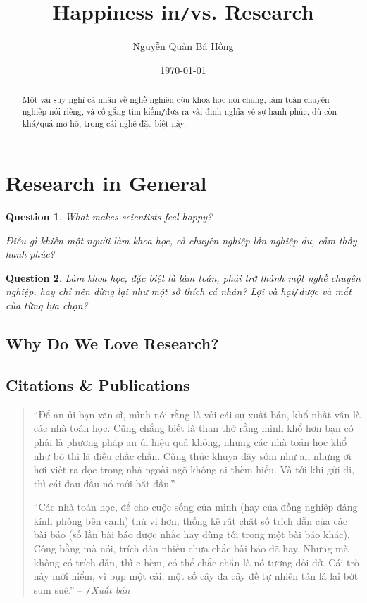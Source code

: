 \documentclass{article}
\title{Happiness in\texttt{/}vs. Research}
\author{Nguyễn Quản Bá Hồng}
\date{\today}
\numberwithin{equation}{section}
\newtheorem{question}{Question}[section]
\begin{document}
\maketitle
\begin{abstract}
	Một vài suy nghĩ cá nhân về nghề nghiên cứu khoa học nói chung, làm toán chuyên nghiệp nói riêng, và cố gắng tìm kiếm\texttt{/}đưa ra vài định nghĩa về sự hạnh phúc, dù còn khá\texttt{/}quá mơ hồ, trong cái nghề đặc biệt này.
\end{abstract}
\tableofcontents


\section{Research in General}
\begin{question}
	What makes scientists feel happy?
	
	Điều gì khiến một người làm khoa học, cả chuyên nghiệp lẫn nghiệp dư, cảm thấy hạnh phúc?
\end{question}

\begin{question}
	Làm khoa học, đặc biệt là làm toán, phải trở thành một nghề chuyên nghiệp, hay chỉ nên dừng lại như một sở thích cá nhân? Lợi và hại\texttt{/}được và mất của từng lựa chọn?
\end{question}

\subsection{Why Do We Love Research?}

\subsection{Citations \& Publications}
\begin{quotation}
	``Để an ủi bạn văn sĩ, mình nói rằng là với cái sự xuất bản, khổ nhất vẫn là các nhà toán học. Cũng chẳng  biết là than thở rằng mình khổ hơn bạn có phải là phương pháp an ủi hiệu quả không, nhưng  các nhà toán học khổ như bò thì là điều chắc chắn. Cũng thức khuya dậy sớm như ai, nhưng ơi hơi  viết ra đọc trong nhà ngoài ngõ không ai thèm hiểu. Và tới khi gửi đi, thì cái đau đầu nó mới bắt đầu.''
	
	``Các nhà toán học, để cho cuộc sống của mình (hay của đồng nghiêp đáng kính phòng bên cạnh) thú vị  hơn, thống kê rất chặt số trích dẫn của các bài báo (số lần bài báo được  nhắc hay dùng tới trong một bài báo khác). Công bằng mà nói, trích dẫn nhiều chưa chắc bài báo đã hay. Nhưng mà không có trích dẫn, thì e hèm, có thể chắc chắn là nó tương đối dở.  Cái trò này mới hiểm, vì bụp một cái, một số  cây đa cây đề  tự nhiên tán lá lại bớt sum suê.'' -- \cite{VHV's blog}\texttt{/}\textit{Xuất bản}
\end{quotation}
\end{document}
